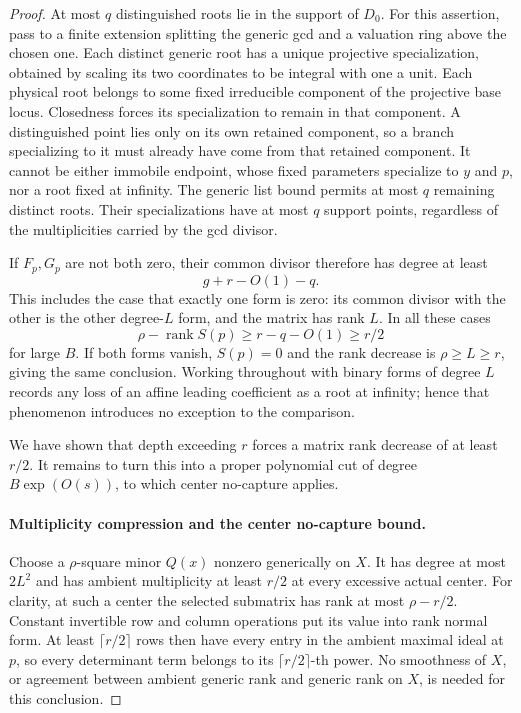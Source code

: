 \begin{proof}
At most $q$ distinguished roots lie in the support of $D_0$.
For this assertion, pass to a finite extension splitting the generic
gcd and a valuation ring above the chosen one. Each distinct generic
root has a unique projective specialization, obtained by scaling its
two coordinates to be integral with one a unit. Each physical root
belongs to some fixed irreducible component of the projective base
locus. Closedness forces its specialization to remain in that
component. A distinguished point lies only on its own retained
component, so a branch specializing to it must already have come
from that retained component. It cannot be either immobile endpoint,
whose fixed parameters specialize to $y$ and $p$, nor a root fixed
at infinity. The generic list bound permits at most $q$ remaining
distinct roots. Their specializations have at most $q$ support points,
regardless of the multiplicities carried by the gcd divisor.

If $F_p,G_p$ are not both zero, their common divisor therefore has
degree at least
\[
 g+r-O(1)-q.
\]
This includes the case that exactly one form is zero: its common
divisor with the other is the other degree-$L$ form, and the matrix
has rank $L$. In all these cases
\[
 \rho-\operatorname{rank}S(p)\ge r-q-O(1)\ge r/2
\]
for large $B$. If both forms vanish, $S(p)=0$ and the rank decrease
is $\rho\ge L\ge r$, giving the same conclusion.
Working throughout with binary forms of degree $L$ records any loss
of an affine leading coefficient as a root at infinity; hence that
phenomenon introduces no exception to the comparison.

We have shown that depth exceeding $r$ forces a matrix rank decrease
of at least $r/2$.  It remains to turn this into a proper polynomial
cut of degree $B\exp(O(s))$, to which center no-capture applies.

\paragraph{Multiplicity compression and the center no-capture bound.}
Choose a $\rho$-square minor $Q(x)$ nonzero generically on $X$.
It has degree at most $2L^2$ and has ambient multiplicity at least
$r/2$ at every excessive actual center. For clarity, at such a center
the selected submatrix has rank at most $\rho-r/2$. Constant
invertible row and column operations put its value into rank normal
form. At least $\lceil r/2\rceil$ rows then have every entry in the ambient
maximal ideal at $p$, so every determinant term belongs to its
$\lceil r/2\rceil$-th power.
No smoothness of $X$, or agreement between ambient generic rank and
generic rank on $X$, is needed for this conclusion.


\end{proof}
